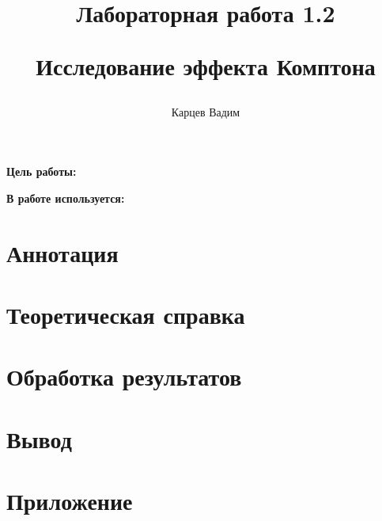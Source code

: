 \documentclass[12pt]{article}
\author{Карцев Вадим}
\title{Лабораторная работа 1.2

Исследование эффекта Комптона}
\begin{document}
  \maketitle

  \textbf{Цель работы:} %

  \textbf{В работе используется:} %

  \section{Аннотация}

  \section{Теоретическая справка}

  \section{Обработка результатов}

  \section{Вывод}
  
  \newpage
  \section{Приложение}
\end{document}
